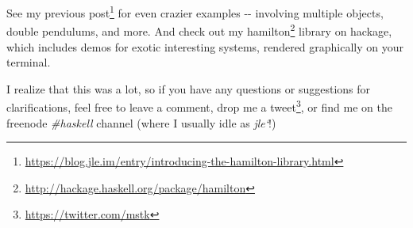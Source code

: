 \documentclass[]{article}
\renewcommand{\href}[2]{#2\footnote{\url{#1}}}
\begin{document}
See my
\href{https://blog.jle.im/entry/introducing-the-hamilton-library.html}{previous
post} for even crazier examples -\/- involving multiple objects, double
pendulums, and more. And check out my
\href{http://hackage.haskell.org/package/hamilton}{hamilton} library on hackage,
which includes demos for exotic interesting systems, rendered graphically on
your terminal.

I realize that this was a lot, so if you have any questions or suggestions for
clarifications, feel free to leave a comment, drop me a
\href{https://twitter.com/mstk}{tweet}, or find me on the freenode
\emph{\#haskell} channel (where I usually idle as \emph{jle`}!)
\end{document}
